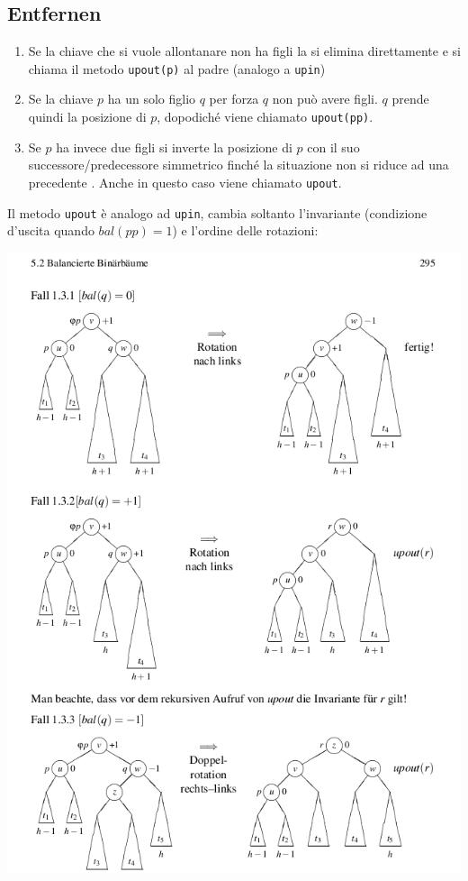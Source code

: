 \documentclass[a4paper]{book}
\newcommand{\inline}[1]{\lstinline!#1!}%
\begin{document}
\subsection*{Entfernen}
\begin{enumerate}
\item Se la chiave che si vuole allontanare non ha figli la si elimina direttamente e si chiama il metodo \inline{upout(p)} al padre (analogo a \inline{upin})
\item Se la chiave $p$ ha un solo figlio $q$ per forza $q$ non può avere figli. $q$ prende quindi la posizione di $p$, dopodiché viene chiamato \inline{upout(pp)}.
\item Se $p$ ha invece due figli si inverte la posizione di $p$ con il suo successore/predecessore simmetrico finché la situazione non si riduce ad una precedente . Anche in questo caso viene chiamato \inline{upout}.
\end{enumerate}
Il metodo \inline{upout} è analogo ad \inline{upin}, cambia soltanto l'invariante (condizione d'uscita quando $bal(pp)=1$) e l'ordine delle rotazioni:
\begin{center}
\includegraphics[scale=0.5]{Figures/avldeletion.png}
\end{center}
\end{document}
